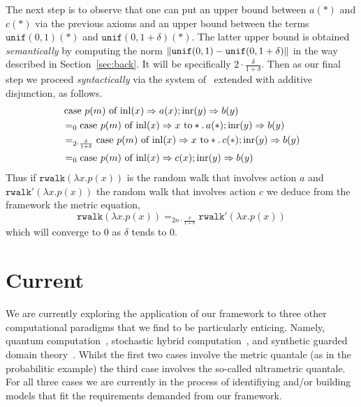 \documentclass[a4paper,UKenglish,cleveref, autoref, thm-restate]{lipics-v2021}
\begin{document}
\begin{example}
        The next step is to observe that one can put an upper bound between
        $a(\ast)$ and $c(\ast)$ via the previous axioms and an upper bound
        between the terms $\mathtt{unif}(0,1)(\ast)$ and
        $\mathtt{unif}(0,1+\delta)(\ast)$. The latter upper bound is obtained
        \emph{semantically} by computing the norm $\left\lVert \mathtt{unif}(0,1) -
        \mathtt{unif}(0,1+\delta)  \right\rVert$ in the way described in
        Section~\ref{sec:back}. It will be specifically $2 \cdot
        {\frac{\delta}{1 + \delta}}$. Then as our final step we proceed
        \emph{syntactically} via the system
        of~\cite{dahlqvist22,dahlqvist2023syntactic} extended with additive
        disjunction, as follows.
        \begin{align*}
               &\, \text{case } p(m) \text{ of } \mathrm{inl}(x) \Rightarrow a(x) ; 
               \mathrm{inr}(y) \Rightarrow b(y)
               \\
               & =_0
               \text{case } p(m) \text{ of } \mathrm{inl}(x) \Rightarrow x \text{ to} 
               \ast. \, a(\ast) 
               ; 
               \mathrm{inr}(y) \Rightarrow b(y)
               \\
               & =_{2 \cdot {\frac{\delta}{1 + \delta}}}
               \text{case } p(m) \text{ of } \mathrm{inl}(x) \Rightarrow x \text{ to} 
               \ast. \, c(\ast) 
               ; 
               \mathrm{inr}(y) \Rightarrow b(y)
               \\
               & =_0
               \text{case } p(m) \text{ of } \mathrm{inl}(x) \Rightarrow c(x) 
               ; 
               \mathrm{inr}(y) \Rightarrow b(y)
        \end{align*}
        Thus if $\mathtt{rwalk}(\lambda x. p(x))$ is the random walk that
        involves action $a$ and $\mathtt{rwalk'}(\lambda x. p(x))$ the random
        walk that involves action $c$ we deduce from the framework the metric
        equation,
        \[
                \mathtt{rwalk}(\lambda x. p(x)) =_{2n \cdot \frac{\delta}{1 + \delta}}
                \mathtt{rwalk'}(\lambda x. p(x)) 
        \]
        which will converge to $0$ as $\delta$ tends to $0$.
\end{example}

\section{Current}

We are currently exploring the application of our framework to three other
computational paradigms that we find to be particularly enticing.  Namely,
quantum computation~\cite{nielsen2010quantum}, stochastic hybrid
computation~\cite{neves20}, and synthetic guarded domain
theory~\cite{birkedal12}. Whilst the first two cases involve the metric
quantale (as in the probabilitic example) the third case involves the so-called
ultrametric quantale. For all three cases we are currently in the process of
identifiying and/or building models that fit the requirements demanded from our
framework.
\end{document}
